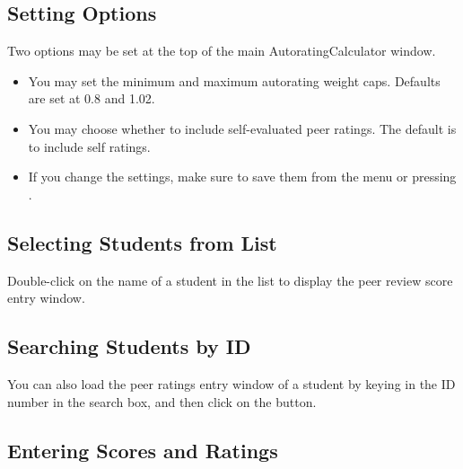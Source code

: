 \documentclass[a4paper,11pt]{refart}
\newcommand\AutoCalc{\textsf{AutoratingCalculator}}
\begin{document}
\subsection{Setting Options}

Two options may be set at the top of the main \AutoCalc{} window.

\begin{itemize}
\item You may set the minimum and maximum autorating weight caps. Defaults are set at 0.8 and 1.02.

\item You may choose whether to include self-evaluated peer ratings. The default is to include self ratings.

\item If you change the settings, make sure to save them from the menu  or pressing .
\end{itemize}

\subsection{Selecting Students from List}

Double-click on the name of a student in the list to display the peer review score entry window.

\subsection{Searching Students by ID}

You can also load the peer ratings entry window of a student by keying in the ID number in the search box, and then click on the  button.

\subsection{Entering Scores and Ratings}
\end{document}
